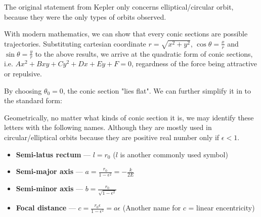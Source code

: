 \documentclass[class=article, crop=false, 12pt]{standalone}
\begin{document}
The original statement from Kepler only concerns elliptical/circular orbit, because they were the only types of orbits observed.


With modern mathematics, we can show that every conic sections are possible trajectories. 
Substituting cartesian coordinate $r=\sqrt{x^2+y^2}$, $\cos{\theta}=\frac{x}{r}$ and $\sin{\theta}=\frac{y}{r}$ to the above results,
we arrive at the quadratic form of conic sections, i.e. $Ax^2+Bxy+Cy^2+Dx+Ey+F=0$, regardness of the force being attractive or repulsive.

By choosing $\theta_0 = 0$, the conic section "lies flat". We can further simplify it in to the standard form:

Geometrically, no matter what kinds of conic section it is, we may identify these letters with the following names.
Although they are mostly used in circular/elliptical orbits because they are positive real number only if $\epsilon<1$.

\begin{itemize}
    \item \textbf{Semi-latus rectum} --- $l = r_0$ \qquad ($l$ is another commonly used symbol)
    \item \textbf{Semi-major axis} --- $\boxed{a = \frac{r_0}{1-\epsilon^2} = -\frac{k}{2E}}$
    \item \textbf{Semi-minor axis} --- $\boxed{b = \frac{r_0}{\sqrt{1-\epsilon^2}}}$ 
    \item \textbf{Focal distance} --- $\boxed{c = \frac{r_0\epsilon}{1-\epsilon^2} = a\epsilon}$ \qquad\qquad  (Another name for $c$ = linear encentricity)
\end{itemize}
\end{document}
